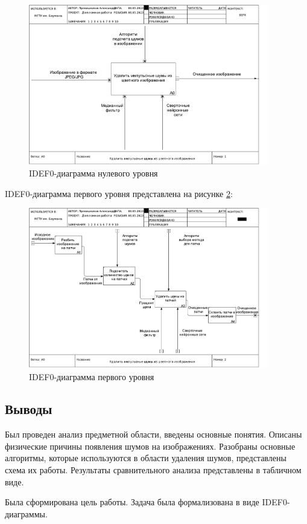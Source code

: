 \FloatBarrier
\begin{figure}[h]	
	\begin{center}
		\includegraphics[height=7cm]{inc/pdf/01_A0.pdf}
	\end{center}
	\captionsetup{justification=centering}
	\caption{IDEF0-диаграмма нулевого уровня}
	\label{idef0::0}
\end{figure}
\FloatBarrier

IDEF0-диаграмма первого уровня представлена на рисунке \ref{idef0::1}:

\FloatBarrier
\begin{figure}[h]	
	\begin{center}
		\includegraphics[height=7cm]{inc/pdf/02_A0.pdf}
	\end{center}
	\captionsetup{justification=centering}
	\caption{IDEF0-диаграмма первого уровня}
	\label{idef0::1}
\end{figure}
\FloatBarrier

\subsection*{Выводы}
Был проведен анализ предметной области, введены основные понятия.
Описаны физические причины появления шумов на изображениях.
Разобраны основные алгоритмы, которые используются в области удаления шумов, представлены схема их работы.
Результаты сравнительного анализа представлены в табличном виде.

Была сформирована цель работы.
Задача была формализована в виде IDEF0-диаграммы.